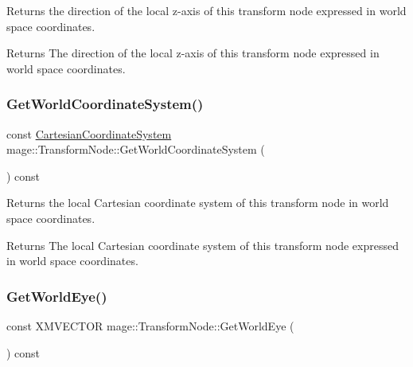 Returns the direction of the local z-\/axis of this transform node expressed in world space coordinates.

\begin{DoxyReturn}{Returns}
The direction of the local z-\/axis of this transform node expressed in world space coordinates. 
\end{DoxyReturn}
\hypertarget{structmage_1_1_transform_node_a511e55c63c15d9e8958f33b298b6c103}{}\label{structmage_1_1_transform_node_a511e55c63c15d9e8958f33b298b6c103} 
\subsubsection{\texorpdfstring{Get\+World\+Coordinate\+System()}{GetWorldCoordinateSystem()}}
{\footnotesize\ttfamily const \hyperlink{structmage_1_1_cartesian_coordinate_system}{Cartesian\+Coordinate\+System} mage\+::\+Transform\+Node\+::\+Get\+World\+Coordinate\+System (\begin{DoxyParamCaption}{ }\end{DoxyParamCaption}) const\hspace{0.3cm}{\ttfamily [noexcept]}}

Returns the local Cartesian coordinate system of this transform node in world space coordinates.

\begin{DoxyReturn}{Returns}
The local Cartesian coordinate system of this transform node expressed in world space coordinates. 
\end{DoxyReturn}
\hypertarget{structmage_1_1_transform_node_a413f7786329b48226572acde4174e484}{}\label{structmage_1_1_transform_node_a413f7786329b48226572acde4174e484} 
\subsubsection{\texorpdfstring{Get\+World\+Eye()}{GetWorldEye()}}
{\footnotesize\ttfamily const X\+M\+V\+E\+C\+T\+OR mage\+::\+Transform\+Node\+::\+Get\+World\+Eye (\begin{DoxyParamCaption}{ }\end{DoxyParamCaption}) const\hspace{0.3cm}{\ttfamily [noexcept]}}

